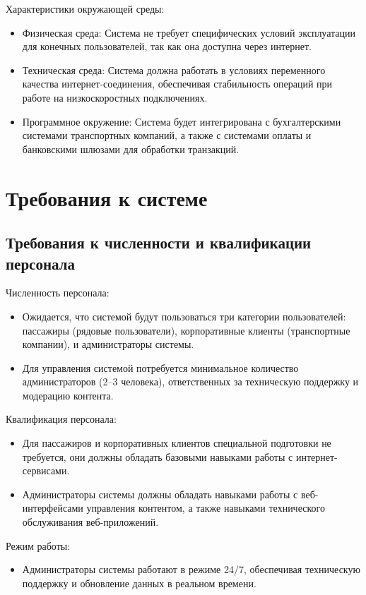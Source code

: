 \noindent Характеристики окружающей среды:
\begin{itemize}
    \item Физическая среда: Система не требует специфических условий
    эксплуатации для конечных пользователей, так как она доступна через
    интернет.
    \item Техническая среда: Система должна работать в условиях переменного
    качества интернет-соединения, обеспечивая стабильность операций при работе
    на низкоскоростных подключениях.
    \item Программное окружение: Система будет интегрирована с бухгалтерскими
    системами транспортных компаний, а также с системами оплаты и банковскими
    шлюзами для обработки транзакций.
\end{itemize}

\section{Требования к системе}

\subsection{Требования к численности и квалификации персонала}

\noindent Численность персонала:
\begin{itemize}
    \item Ожидается, что системой будут пользоваться три категории
    пользователей: пассажиры (рядовые пользователи), корпоративные клиенты
    (транспортные компании), и администраторы системы.
    \item Для управления системой потребуется минимальное количество
    администраторов (2–3 человека), ответственных за техническую поддержку и
    модерацию контента.
\end{itemize}

\noindent Квалификация персонала:
\begin{itemize}
    \item Для пассажиров и корпоративных клиентов специальной подготовки не
    требуется, они должны обладать базовыми навыками работы с
    интернет-сервисами.
    \item Администраторы системы должны обладать навыками работы с
    веб-интерфейсами управления контентом, а также навыками технического
    обслуживания веб-приложений.
\end{itemize}

\noindent Режим работы:
\begin{itemize}
    \item Администраторы системы работают в режиме 24/7, обеспечивая техническую
    поддержку и обновление данных в реальном времени.
\end{itemize}

